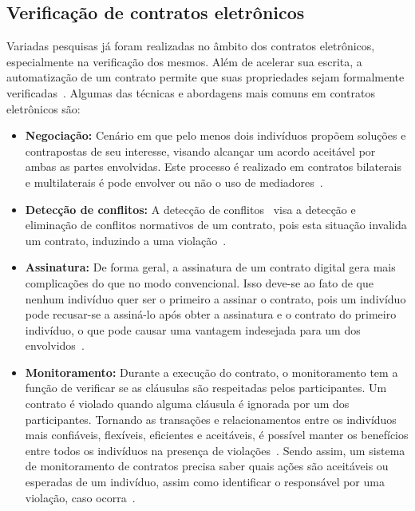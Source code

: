 \subsection{Verificação de contratos eletrônicos}

Variadas pesquisas já foram realizadas no âmbito dos contratos eletrônicos, especialmente na verificação dos mesmos. Além de acelerar sua escrita, a automatização de um contrato permite que suas propriedades sejam formalmente verificadas~\cite{fenech2008conflict}. Algumas das técnicas e abordagens mais comuns em contratos eletrônicos são:

\begin{itemize}
	\item \textbf{Negociação:} Cenário em que pelo menos dois indivíduos propõem soluções e contrapostas de seu interesse, visando alcançar um acordo aceitável por ambas as partes envolvidas. Este processo é realizado em contratos bilaterais e multilaterais é pode envolver ou não o uso de mediadores~\cite{bosse2008automated}.
	\item \textbf{Detecção de conflitos:} A detecção de conflitos~\cite{xu2004monitoring} visa a detecção e eliminação de conflitos normativos de um contrato, pois esta situação invalida um contrato, induzindo a uma violação~\cite{bobbio1999teoria}.
	\item \textbf{Assinatura:} De forma geral, a assinatura de um contrato digital gera mais complicações do que no modo convencional. Isso deve-se ao fato de que nenhum indivíduo quer ser o primeiro a assinar o contrato, pois um indivíduo pode recusar-se a assiná-lo após obter a assinatura e o contrato do primeiro indivíduo, o que pode causar uma vantagem indesejada para um dos envolvidos~\cite{chadha2006formal, kordy2012constructing}.
	\item \textbf{Monitoramento:} Durante a execução do contrato, o monitoramento tem a função de verificar se as cláusulas são respeitadas pelos participantes. Um contrato é violado quando alguma cláusula é ignorada por um dos participantes. Tornando as transações e relacionamentos entre os indivíduos mais confiáveis, flexíveis, eficientes e aceitáveis, é possível manter os benefícios entre todos os indivíduos na presença de violações~\cite{xu2004monitoring}. Sendo assim, um sistema de monitoramento de contratos precisa saber quais ações são aceitáveis ou esperadas de um indivíduo, assim como identificar o responsável por uma violação, caso ocorra~\cite{xu2004monitoring}.
\end{itemize}  


